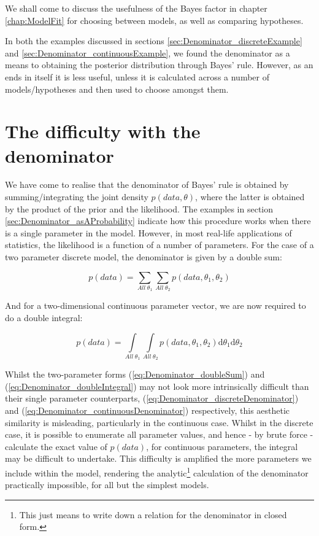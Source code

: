 \documentclass[11pt,fullpage]{book}
\begin{document}
We shall come to discuss the usefulness of the Bayes factor in chapter \ref{chap:ModelFit} for choosing between models, as well as comparing hypotheses.

In both the examples discussed in sections \ref{sec:Denominator_discreteExample} and \ref{sec:Denominator_continuousExample}, we found the denominator as a means to obtaining the posterior distribution through Bayes' rule. However, as an ends in itself it is less useful, unless it is calculated across a number of models/hypotheses and then used to choose amongst them.

\section{The difficulty with the denominator}\label{sec:Denominator_difficulty}
We have come to realise that the denominator of Bayes' rule is obtained by summing/integrating the joint density $p(data,\theta)$, where the latter is obtained by the product of the prior and the likelihood. The examples in section \ref{sec:Denominator_asAProbability} indicate how this procedure works when there is a single parameter in the model. However, in most real-life applications of statistics, the likelihood is a function of a number of parameters. For the case of a two parameter discrete model, the denominator is given by a double sum:

\begin{equation}\label{eq:Denominator_doubleSum}
p(data) = \sum\limits_{All\;\theta_1}\sum\limits_{All\;\theta_2}p(data,\theta_1,\theta_2)
\end{equation}

And for a two-dimensional continuous parameter vector, we are now required to do a double integral:

\begin{equation}\label{eq:Denominator_doubleIntegral}
p(data) = \int\limits_{All\;\theta_1}\int\limits_{All\;\theta_2}p(data,\theta_1,\theta_2)\mathrm{d}\theta_1\mathrm{d}\theta_2
\end{equation}

Whilst the two-parameter forms (\ref{eq:Denominator_doubleSum}) and (\ref{eq:Denominator_doubleIntegral}) may not look more intrinsically difficult than their single parameter counterparts, (\ref{eq:Denominator_discreteDenominator}) and (\ref{eq:Denominator_continuousDenominator}) respectively, this aesthetic similarity is misleading, particularly in the continuous case. Whilst in the discrete case, it is possible to enumerate all parameter values, and hence - by brute force - calculate the exact value of $p(data)$, for continuous parameters, the integral may be difficult to undertake. This difficulty is amplified the more parameters we include within the model, rendering the analytic\footnote{This just means to write down a relation for the denominator in closed form.} calculation of the denominator practically impossible, for all but the simplest models.
\end{document}

